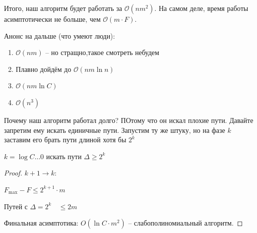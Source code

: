 Итого, наш алгоритм будет работать за $\mathcal{O}(n m^2)$. На самом деле, время работы асимптотически не больше, чем $\mathcal{O}(m \cdot F)$.

Анонс на дальше (что умеют люди):
\begin{enumerate}
    \item  $\mathcal{O}(nm)$ -- но стращно,такое смотреть небудем
    \item Плавно дойдём до $\mathcal{O}(nm \ln n)$
    \item $\mathcal{O}(nm\ln C)$
    \item $\mathcal{O}(n^3)$
\end{enumerate}

\begin{definition}
    [Масштабирование]
    Почему наш алгоритм работал долго? ПОтому что он искал плохие пути. Давайте запретим ему искать единичные пути. 
    Запустим ту же штуку, но на фазе $k$ заставим его брать пути длиной хотя бы $2^k$

    $k = \log C \ldots 0 $ искать пути $\Delta \geqslant 2^k $
\end{definition}
\begin{proof}
    $k+1 \to k $:

    $F_{\max} - F \leqslant 2^{k+1} \cdot m $

    Путей с $\Delta = 2^k\quad \leqslant 2m $

    Финальная асимптотика: $O(\ln C \cdot m^2 )$ -- слабополиномиальный алгоритм.
\end{proof}
\endinput